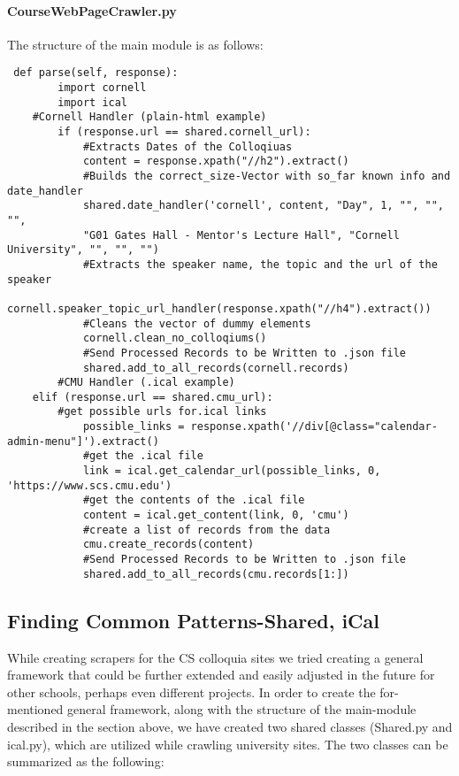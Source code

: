 \documentclass[a4paper,11pt]{article}
\begin{document}
\paragraph{CourseWebPageCrawler.py}
The structure of the main module is as follows:
\begin{verbatim}
 def parse(self, response):
        import cornell
        import ical
    #Cornell Handler (plain-html example)
        if (response.url == shared.cornell_url):
            #Extracts Dates of the Colloqiuas 
            content = response.xpath("//h2").extract()
            #Builds the correct_size-Vector with so_far known info and date_handler
            shared.date_handler('cornell', content, "Day", 1, "", "", "", 
            "G01 Gates Hall - Mentor's Lecture Hall", "Cornell University", "", "", "")
            #Extracts the speaker name, the topic and the url of the speaker
            cornell.speaker_topic_url_handler(response.xpath("//h4").extract())
            #Cleans the vector of dummy elements
            cornell.clean_no_colloqiums()
            #Send Processed Records to be Written to .json file
            shared.add_to_all_records(cornell.records)
        #CMU Handler (.ical example)
    elif (response.url == shared.cmu_url):
        #get possible urls for.ical links
            possible_links = response.xpath('//div[@class="calendar-admin-menu"]').extract()
            #get the .ical file
            link = ical.get_calendar_url(possible_links, 0, 'https://www.scs.cmu.edu')
            #get the contents of the .ical file
            content = ical.get_content(link, 0, 'cmu')
            #create a list of records from the data
            cmu.create_records(content)
            #Send Processed Records to be Written to .json file
            shared.add_to_all_records(cmu.records[1:])
\end{verbatim}

    \subsection{Finding Common Patterns-Shared, iCal}
    While creating scrapers for the CS colloquia sites we tried creating a general framework that could be further extended and easily adjusted in the future for other schools, perhaps even different projects. In order to create the for-mentioned general framework, along with the structure of the main-module described in the section above, we have created two shared classes (Shared.py and ical.py), which are utilized while crawling university sites. The two classes can be summarized as the following:
\end{document}
